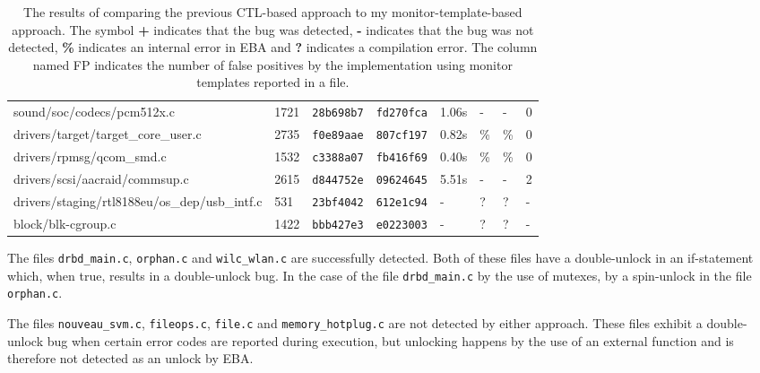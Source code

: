 \begin{table}[H]
\begin{tabular}{llllllll}
    sound/soc/codecs/pcm512x.c                    & 1721           & \texttt{28b698b7}   & \texttt{fd270fca}   & 1.06s         & -             & -            & 0           \\
    drivers/target/target\_core\_user.c           & 2735           & \texttt{f0e89aae}   & \texttt{807cf197}   & 0.82s         & \%            & \%           & 0           \\
    drivers/rpmsg/qcom\_smd.c                     & 1532           & \texttt{c3388a07}   & \texttt{fb416f69}   & 0.40s         & \%            & \%           & 0           \\
    drivers/scsi/aacraid/commsup.c                & 2615           & \texttt{d844752e}   & \texttt{09624645}   & 5.51s         & -             & -            & 2           \\
    drivers/staging/rtl8188eu/os\_dep/usb\_intf.c & 531            & \texttt{23bf4042}   & \texttt{612e1c94}   & -             & ?             & ?            & -           \\
    block/blk-cgroup.c                            & 1422           & \texttt{bbb427e3}   & \texttt{e0223003}   & -             & ?             & ?            & -           
    \end{tabular}
    \caption{The results of comparing the previous CTL-based approach to my monitor-template-based approach. The symbol \textbf{+} indicates that the bug was detected, \textbf{-} indicates that the bug was not detected, \textbf{\%} indicates an internal error in EBA and \textbf{?} indicates a compilation error. The column named FP indicates the number of false positives by the implementation using monitor templates reported in a file.}
    \label{evaluation-table}
\end{table}

\newpar The files \texttt{drbd\_main.c}, \texttt{orphan.c} and \texttt{wilc\_wlan.c} are successfully detected. Both of these files have a double-unlock in an if-statement which, when true, results in a double-unlock bug. In the case of the file \texttt{drbd\_main.c} by the use of mutexes, by a spin-unlock in the file \texttt{orphan.c}. 

\newpar The files \texttt{nouveau\_svm.c}, \texttt{fileops.c}, \texttt{file.c} and \texttt{memory\_hotplug.c} are not detected by either approach. These files exhibit a double-unlock bug when certain error codes are reported during execution, but unlocking happens by the use of an external function and is therefore not detected as an unlock by EBA.

